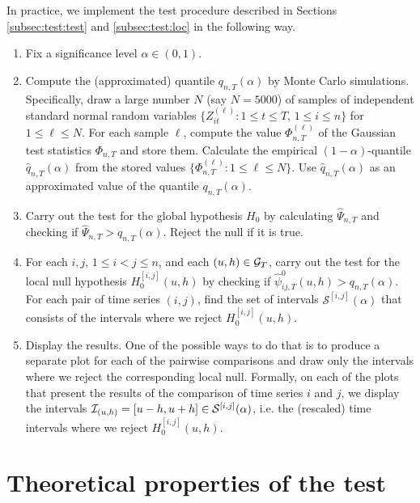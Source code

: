 \documentclass[a4paper,12pt]{article}
\begin{document}
In practice, we implement the test procedure described in Sections \ref{subsec:test:test} and \ref{subsec:test:loc} in the following way. 
\begin{enumerate}[label=\textit{Step \arabic*.}, leftmargin=1.45cm]
\item Fix a significance level $\alpha \in (0, 1)$. 
\item Compute the (approximated) quantile $q_{n, T}(\alpha)$ by Monte Carlo simulations. Specifically, draw a large number $N$ (say $N=5000$) of samples of independent standard normal random variables $\{Z_{it}^{(\ell)} : 1 \le t \le T, \, 1 \le i \le n \}$ for $1 \le \ell \le N$. For each sample $\ell$, compute the value $\Phi_{n,T}^{(\ell)}$ of the Gaussian test statistics $\Phi_{n, T}$ and store them. Calculate the empirical $(1-\alpha)$-quantile $\hat{q}_{n, T}(\alpha)$ from the stored values $\{ \Phi_{n, T}^{(\ell)}: 1 \le \ell \le N \}$. Use $\hat{q}_{n, T}(\alpha)$ as an approximated value of the quantile $q_{n, T}(\alpha)$.
\item Carry out the test for the global hypothesis $H_0$ by calculating $\widehat{\Psi}_{n, T}$ and checking if $\widehat{\Psi}_{n, T} > q_{n, T}(\alpha)$. Reject the null if it is true.
\item For each $i, j,\, 1 \le i < j \le n$, and each $(u, h) \in \mathcal{G}_T$, carry out the test for the local null hypothesis $H_0^{[i, j]}(u, h)$ by checking if $\hat{\psi}^0_{ij, T}(u, h)> q_{n, T}(\alpha)$. For each pair of time series $(i, j)$, find the set of intervals $\mathcal{S}^{[i, j]}(\alpha)$ that consists of the intervals where we reject $H_0^{[i,j]}(u,h)$. 
\item Display the results. One of the possible ways to do that is to produce a separate plot for each of the pairwise comparisons and draw only the intervals where we reject the corresponding local null. Formally, on each of the plots that present the results of the comparison of time series $i$ and $j$, we display the intervals $\mathcal{I}_{(u, h)} = [u- h, u+h] \in \mathcal{S}^{[i, j]}(\alpha)$, i.e. the (rescaled) time intervals where we reject $H_0^{[i, j]}(u, h)$. 
\end{enumerate}


\section{Theoretical properties of the test}\label{sec:theo}
\end{document}
